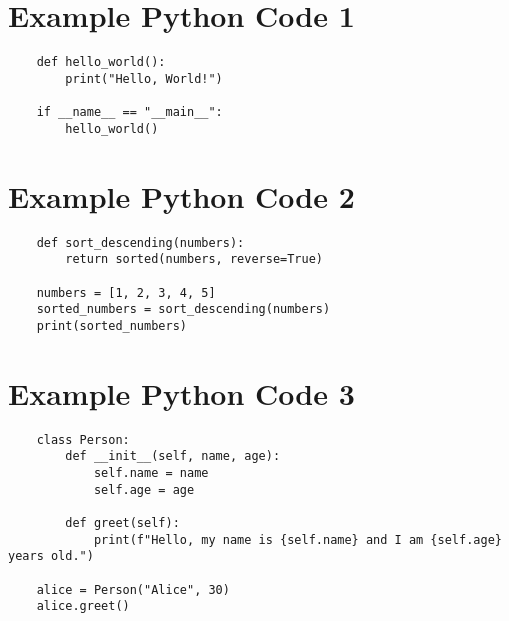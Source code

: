 \documentclass[a4paper, landscape, 9pt]{jarticle} %
\begin{document}
\begin{multicols*}{3}
    \lstset{style=python}

    \section*{Example Python Code 1}
    \begin{lstlisting}
    def hello_world():
        print("Hello, World!")

    if __name__ == "__main__":
        hello_world()
    \end{lstlisting}

    \section*{Example Python Code 2}
    \begin{lstlisting}
    def sort_descending(numbers):
        return sorted(numbers, reverse=True)

    numbers = [1, 2, 3, 4, 5]
    sorted_numbers = sort_descending(numbers)
    print(sorted_numbers)
    \end{lstlisting}

    \section*{Example Python Code 3}
    \begin{lstlisting}
    class Person:
        def __init__(self, name, age):
            self.name = name
            self.age = age

        def greet(self):
            print(f"Hello, my name is {self.name} and I am {self.age} years old.")

    alice = Person("Alice", 30)
    alice.greet()
    \end{lstlisting}

    

\end{multicols*}
\end{document}
